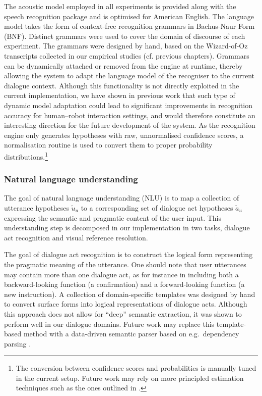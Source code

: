 The acoustic model employed in all experiments is provided along with the speech recognition package and is optimised for American English. The language model takes the form of context-free recognition grammars in Bachus-Naur Form (BNF). Distinct grammars were used to cover the domain of discourse of each experiment. The grammars were designed by hand, based on the Wizard-of-Oz transcripts collected in our empirical studies (cf. previous chapters). Grammars can be dynamically attached or removed from the engine at runtime, thereby allowing the system to adapt the language model of the recogniser to the current dialogue context. Although this functionality is not directly exploited in the current implementation, we have shown in previous work \citep[see][]{ESSLLI2008-springerreprint} that such type of dynamic model adaptation could lead to significant improvements in recognition accuracy for human--robot interaction settings, and would therefore constitute an interesting direction for the future development of the system.  As the recognition engine only generates hypotheses with raw, unnormalised confidence scores, a normalisation routine is used to convert them to proper probability distributions.\footnote{The conversion between confidence scores and probabilities is manually tuned in the current setup.  Future work may rely on more principled estimation techniques such as the ones outlined in \cite{Williams08}.}


\subsubsection*{Natural language understanding}

The goal of natural language understanding (NLU) is to map a collection of utterance hypotheses $\tilde{u}_u$ to a corresponding set of dialogue act hypotheses $\tilde{a}_u$ expressing the semantic and pragmatic content of the user input. This understanding step is decomposed in our implementation in two tasks, dialogue act recognition and visual reference resolution.  

The goal of dialogue act recognition is to construct the logical form representing the pragmatic meaning of the utterance. One should note that user utterances may contain more than one dialogue act, as for instance in  including both a backward-looking function (a confirmation) and a forward-looking function (a new instruction).  A collection of domain-specific templates was designed by hand to convert surface forms into logical representations of dialogue acts.  Although this approach does not allow for ``deep'' semantic extraction, it was shown to perform well in our dialogue domains. Future work may replace this template-based method with a data-driven semantic parser based on e.g.\  dependency parsing \citep{Nivre:Etal07}.  

